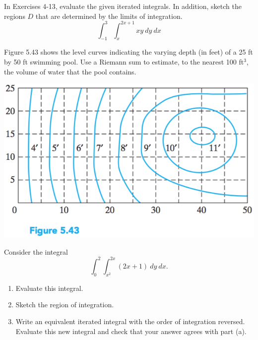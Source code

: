 \documentclass[12pt,letterpaper]{hmcpset}
\begin{document}

\begin{problem}[Colley 5.2.7]
    In Exercises 4-13, evaluate the given iterated integrals. In
    addition, sketch the regions $D$ that are determined by the limits
    of integration.
    \[
        \int_{-1}^3\int_x^{2x+1}xy\ dy\ dx
    \]
\end{problem}
\begin{solution}
    \vfill
\end{solution}
\newpage

\begin{problem}[Colley 5.2.14]
    Figure 5.43 shows the level curves indicating the varying depth
    (in feet) of a 25 ft by 50 ft swimming pool. Use a Riemann sum to
    estimate, to the nearest 100 ft$^3$, the volume of water that the
    pool contains.
    \begin{center}
        \includegraphics[scale=0.8]{img/5_2_14}
    \end{center}
\end{problem}
\begin{solution}
    \vfill
\end{solution}
\newpage

\begin{problem}[Colley 5.3.1]
    Consider the integral
    \[
        \int_0^2\int_{x^2}^{2x}(2x+1)\ dy\ dx.
    \]
    \begin{enumerate}
        \item Evaluate this integral.
        \item Sketch the region of integration. 
        \item Write an equivalent iterated integral with the order of
            integration reversed. Evaluate this new integral and check
            that your answer agrees with part (a).
    \end{enumerate}
\end{problem}
\begin{solution}
    \vfill
\end{solution}
\newpage
\end{document}
